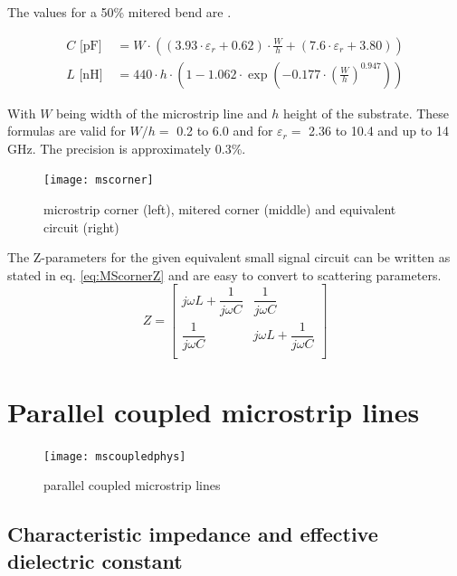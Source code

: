 \documentclass[10pt]{report}
\begin{document}
The values for a 50\% mitered bend are \cite{Kirschning4}.

\begin{align}
C \text{ [pF] } &= W \cdot \left( (3.93\cdot\varepsilon_r + 0.62) \cdot \frac{W}{h} +
			       (7.6\cdot\varepsilon_r + 3.80) \right)\\
L \text{ [nH]} &= 440\cdot h \cdot \left( 1 - 1.062\cdot\exp\left( -0.177\cdot
		   \left( \frac{W}{h} \right)^{0.947} \right) \right)
\end{align}

With $W$ being width of the microstrip line and $h$ height of the
substrate.  These formulas are valid for $W/h = $ 0.2 to 6.0 and for
$\varepsilon_r = $ 2.36 to 10.4 and up to 14 GHz. The precision is
approximately 0.3\%.

\begin{figure}[ht]
\begin{center}
\texttt{[image: mscorner]}
\end{center}
\caption{microstrip corner (left), mitered corner (middle) and equivalent circuit (right)}
\label{fig:MScorner}
\end{figure}
\FloatBarrier

The Z-parameters for the given equivalent small signal circuit can be
written as stated in eq. \eqref{eq:MScornerZ} and are easy to convert
to scattering parameters.
\begin{equation}
Z =
\begin{bmatrix}
j\omega L + \dfrac{1}{j\omega C} & \dfrac{1}{j\omega C}\\
\dfrac{1}{j\omega C} & j\omega L + \dfrac{1}{j\omega C}\\
\end{bmatrix}
\label{eq:MScornerZ}
\end{equation}

\section{Parallel coupled microstrip lines}

\begin{figure}[ht]
\begin{center}
\texttt{[image: mscoupledphys]}
\end{center}
\caption{parallel coupled microstrip lines}
\label{fig:McoupledPhys}
\end{figure}
\FloatBarrier

\subsection{Characteristic impedance and effective dielectric constant}
\end{document}
